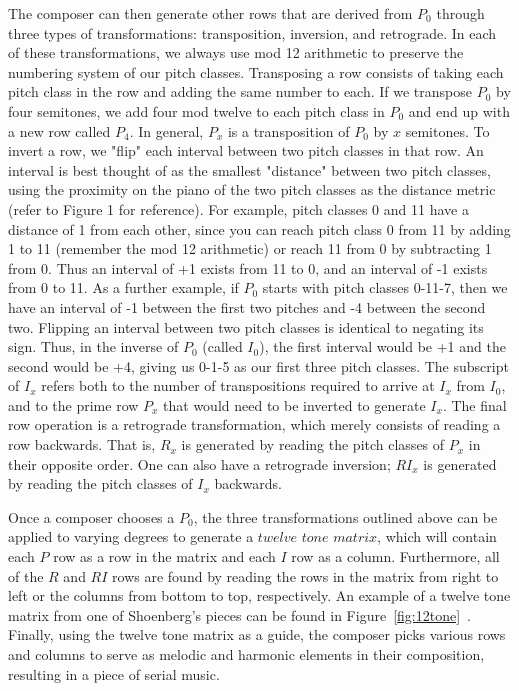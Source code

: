 The composer can then generate other rows that are derived from $P_0$ through three types of transformations:
transposition, inversion, and retrograde. In each of these transformations, we always use mod 12 arithmetic to preserve the 
numbering system of our pitch classes. Transposing a row consists of taking each pitch class in the row and adding the same number 
to each. If we transpose $P_0$ by four semitones, we add four mod twelve to each pitch class in $P_0$ and end up with a new row 
called $P_4$. In general, $P_x$ is a transposition of $P_0$ by $x$ semitones. To invert a row, we "flip" each interval between two 
pitch classes in that row. An interval is best thought of as the smallest "distance" between two pitch classes, using the proximity
on the piano of the two pitch classes as the distance metric (refer to Figure 1 for reference). 
For example, pitch classes 0 and 11 have a distance of 1 from each other,
since you can reach pitch class 0 from 11 by adding 1 to 11 (remember the mod 12 arithmetic) or reach 11 from 0 by subtracting 1
from 0. Thus an interval of +1 exists from 11 to 0, and an interval of -1 exists from 0 to 11.
As a further example, if $P_0$ starts with pitch classes 0-11-7, then we have an interval of -1 between the first two 
pitches and -4  between the second two. Flipping an interval between two pitch classes is identical to
negating its sign.
Thus, in the inverse of $P_0$ (called $I_0$), the first interval would be +1 and the second would 
be +4, giving us 0-1-5 as our first three pitch classes.  The subscript of $I_x$  refers both to the number of transpositions required 
to arrive at $I_x$ from $I_0$, and to the prime row $P_x$ that would need to be inverted to generate $I_x$. The final row 
operation is a retrograde transformation, which merely consists of reading a row backwards. That is, $R_x$ is generated by reading 
the pitch classes of $P_x$ in their opposite order. One can also have a retrograde inversion; $RI_x$ is generated by reading the 
pitch classes of $I_x$ backwards.

Once a composer chooses a $P_0$, the three transformations outlined above can be applied to varying degrees to generate a 
$twelve$ $tone$ $matrix$, which will contain each $P$ row as a row in the matrix and each $I$ row as a column.
Furthermore, all of the $R$ and $RI$ rows are found by reading the rows in the matrix from right to left or the columns 
from bottom to top, respectively. An example of a twelve tone matrix from one of Shoenberg's pieces can be found in 
Figure~\ref{fig:12tone}~\cite{devoto2013twelve}. Finally, using the twelve tone matrix as a guide, the composer picks 
various rows and columns to serve as melodic and harmonic elements in their composition, resulting in a piece of serial music.

